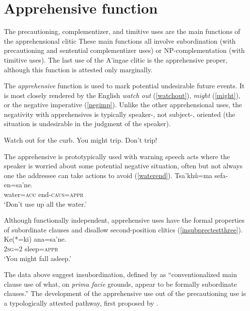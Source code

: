 \documentclass[output=paper,colorlinks,citecolor=brown]{langscibook}
\begin{document}
\section{Apprehensive function} \label{sec:monoclausaluses}

The precautioning, complementizer, and timitive uses are the main functions of the apprehensional clitic \sane[.] These main functions all involve subordination (with precautioning and sentential complementizer uses) or NP-com\-ple\-men\-ta\-tion (with timitive uses). The last use of the A'ingae  clitic is the apprehensive proper, although this function is attested only marginally.

The \emph{apprehensive} function is used to mark potential undesirable future events. It is most closely rendered by the English \emph{watch out} (\ref{watchout}), \emph{might} (\ref{might}), or the negative imperative (\ref{negimp}). Unlike the other apprehensional uses, the negativity with apprehensives is typically speaker-, not subject-, oriented (the situation is undesirable in the judgment of the speaker). 


\begin{exe}
    \ex \label{watchout}
     Watch out for the curb.
    \ex \label{might}
    You might trip.
    \ex \label{negimp}
     Don't trip!
\end{exe}

The apprehensive is prototypically used with warning speech acts where the speaker is worried about some potential negative situation, often but not always one the addressee can take actions to avoid (\ref{waterend}).
    \ea \label{waterend}
    \gll {\ob}Tsa'khû=ma sefa-en{\cb}=sa'ne. \\
    water=\textsc{acc} {end-\textsc{caus=appr}} \\
    \glt `Don't use up all the water.'
    \hfill \citep[p. 37]{borman1990lessons}
    \z

Although functionally independent, apprehensive uses have the formal properties of subordinate clauses and disallow second-position clitics (\ref{insubprectestthree}).
    \ea \label{insubprectestthree}
    \gll {\ob}Ke{\rm(*}=ki{\rm)} ana=sa'ne.{\cb} \\
         \textsc{2sg=2} sleep=\textsc{appr}\\
    \glt `You might fall asleep.'
    \z

The data above suggest insubordination, defined by \citet[p. 367]{evans2007insubordination} as ``conventionalized main clause use of what, on \emph{prima facie} grounds, appear to be formally subordinate clauses.'' The development of the apprehensive use out of the precautioning use is a typologically attested pathway, first proposed by \citet{lichtenberk1995apprehensional}. 
\end{document}
